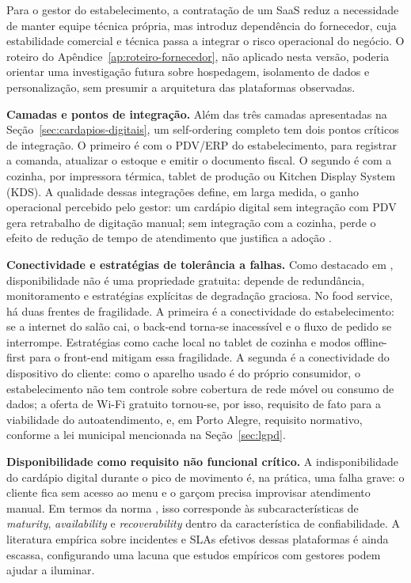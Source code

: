 Para o gestor do estabelecimento, a contratação de um SaaS reduz a necessidade de manter equipe técnica própria, mas introduz dependência do fornecedor, cuja estabilidade comercial e técnica passa a integrar o risco operacional do negócio. O roteiro do Apêndice~\ref{ap:roteiro-fornecedor}, não aplicado nesta versão, poderia orientar uma investigação futura sobre hospedagem, isolamento de dados e personalização, sem presumir a arquitetura das plataformas observadas.

\textbf{Camadas e pontos de integração.} Além das três camadas apresentadas na Seção~\ref{sec:cardapios-digitais}, um self-ordering completo tem dois pontos críticos de integração. O primeiro é com o PDV/ERP do estabelecimento, para registrar a comanda, atualizar o estoque e emitir o documento fiscal. O segundo é com a cozinha, por impressora térmica, tablet de produção ou Kitchen Display System (KDS). A qualidade dessas integrações define, em larga medida, o ganho operacional percebido pelo gestor: um cardápio digital sem integração com PDV gera retrabalho de digitação manual; sem integração com a cozinha, perde o efeito de redução de tempo de atendimento que justifica a adoção \cite{fioreti2026aplicativos,oliveira2017autoatendimento}.

\textbf{Conectividade e estratégias de tolerância a falhas.} Como destacado em , disponibilidade não é uma propriedade gratuita: depende de redundância, monitoramento e estratégias explícitas de degradação graciosa. No food service, há duas frentes de fragilidade. A primeira é a conectividade do estabelecimento: se a internet do salão cai, o back-end torna-se inacessível e o fluxo de pedido se interrompe. Estratégias como cache local no tablet de cozinha e modos offline-first para o front-end mitigam essa fragilidade. A segunda é a conectividade do dispositivo do cliente: como o aparelho usado é do próprio consumidor, o estabelecimento não tem controle sobre cobertura de rede móvel ou consumo de dados; a oferta de Wi-Fi gratuito tornou-se, por isso, requisito de fato para a viabilidade do autoatendimento, e, em Porto Alegre, requisito normativo, conforme a lei municipal mencionada na Seção~\ref{sec:lgpd}.

\textbf{Disponibilidade como requisito não funcional crítico.} A indisponibilidade do cardápio digital durante o pico de movimento é, na prática, uma falha grave: o cliente fica sem acesso ao menu e o garçom precisa improvisar atendimento manual. Em termos da norma \cite{iso25010}, isso corresponde às subcaracterísticas de \emph{maturity}, \emph{availability} e \emph{recoverability} dentro da característica de confiabilidade. A literatura empírica sobre incidentes e SLAs efetivos dessas plataformas é ainda escassa, configurando uma lacuna que estudos empíricos com gestores podem ajudar a iluminar.

